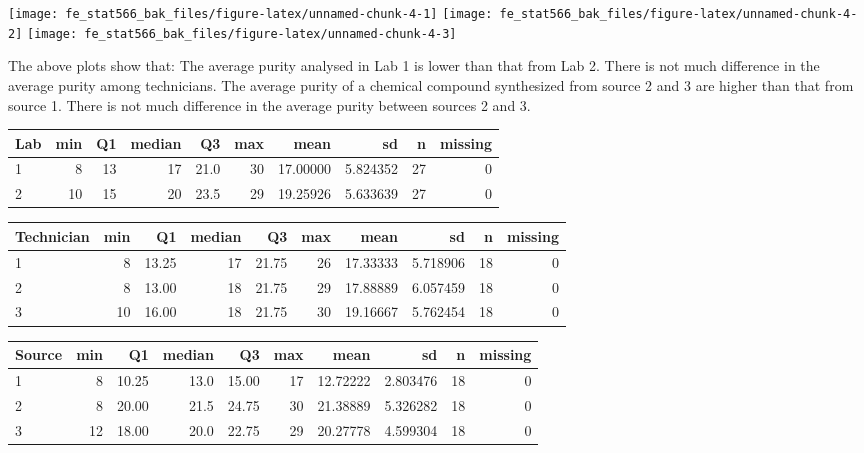 \documentclass[12pt,]{article}
\begin{document}
\texttt{[image: fe\_stat566\_bak\_files/figure-latex/unnamed-chunk-4-1]}
\texttt{[image: fe\_stat566\_bak\_files/figure-latex/unnamed-chunk-4-2]}
\texttt{[image: fe\_stat566\_bak\_files/figure-latex/unnamed-chunk-4-3]}

The above plots show that: The average purity analysed in Lab 1 is lower
than that from Lab 2. There is not much difference in the average purity
among technicians. The average purity of a chemical compound synthesized
from source 2 and 3 are higher than that from source 1. There is not
much difference in the average purity between sources 2 and 3.

\begin{table}[H]
\centering\begingroup\fontsize{8}{10}\selectfont

\begin{tabular}{lrrrrr>{\columncolor[HTML]{EAFAF1}}rrrr}
\toprule
Lab & min & Q1 & median & Q3 & max & mean & sd & n & missing\\
\midrule
1 & 8 & 13 & 17 & 21.0 & 30 & 17.00000 & 5.824352 & 27 & 0\\
2 & 10 & 15 & 20 & 23.5 & 29 & 19.25926 & 5.633639 & 27 & 0\\
\bottomrule
\end{tabular}
\endgroup{}
\end{table}

\begin{table}[H]
\centering\begingroup\fontsize{8}{10}\selectfont

\begin{tabular}{lrrrrr>{\columncolor[HTML]{EAFAF1}}rrrr}
\toprule
Technician & min & Q1 & median & Q3 & max & mean & sd & n & missing\\
\midrule
1 & 8 & 13.25 & 17 & 21.75 & 26 & 17.33333 & 5.718906 & 18 & 0\\
2 & 8 & 13.00 & 18 & 21.75 & 29 & 17.88889 & 6.057459 & 18 & 0\\
3 & 10 & 16.00 & 18 & 21.75 & 30 & 19.16667 & 5.762454 & 18 & 0\\
\bottomrule
\end{tabular}
\endgroup{}
\end{table}

\begin{table}[H]
\centering\begingroup\fontsize{8}{10}\selectfont

\begin{tabular}{lrrrrr>{\columncolor[HTML]{EAFAF1}}rrrr}
\toprule
Source & min & Q1 & median & Q3 & max & mean & sd & n & missing\\
\midrule
1 & 8 & 10.25 & 13.0 & 15.00 & 17 & 12.72222 & 2.803476 & 18 & 0\\
2 & 8 & 20.00 & 21.5 & 24.75 & 30 & 21.38889 & 5.326282 & 18 & 0\\
3 & 12 & 18.00 & 20.0 & 22.75 & 29 & 20.27778 & 4.599304 & 18 & 0\\
\bottomrule
\end{tabular}
\endgroup{}
\end{table}
\end{document}
